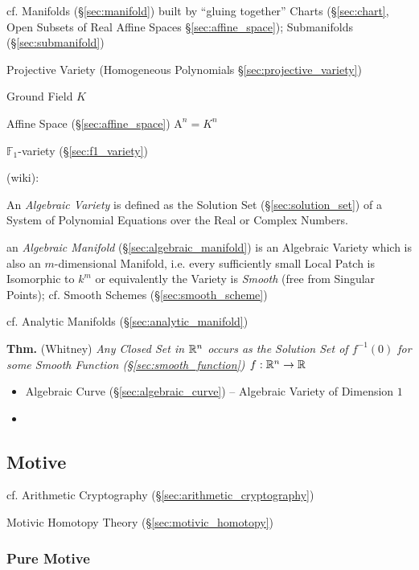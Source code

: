cf. Manifolds (\S\ref{sec:manifold}) built by ``gluing together'' Charts
(\S\ref{sec:chart}, Open Subsets of Real Affine Spaces
\S\ref{sec:affine_space}); Submanifolds (\S\ref{sec:submanifold})

\fist Projective Variety (Homogeneous Polynomials
\S\ref{sec:projective_variety})

Ground Field $K$

Affine Space (\S\ref{sec:affine_space}) $\mathrm{A}^n = K^n$

\fist $\mathbb{F}_1$-variety (\S\ref{sec:f1_variety})


(wiki):

An \emph{Algebraic Variety} is defined as the Solution Set
(\S\ref{sec:solution_set}) of a System of Polynomial Equations over the Real or
Complex Numbers.

\fist an \emph{Algebraic Manifold} (\S\ref{sec:algebraic_manifold}) is an
Algebraic Variety which is also an $m$-dimensional Manifold, i.e. every
sufficiently small Local Patch is Isomorphic to $k^m$ or equivalently the
Variety is \emph{Smooth} (free from Singular Points); cf. Smooth Schemes
(\S\ref{sec:smooth_scheme})

cf. Analytic Manifolds (\S\ref{sec:analytic_manifold})

\textbf{Thm.} (Whitney) \emph{Any Closed Set in $\mathbb{R}^n$ occurs as the
  Solution Set of $f^{-1}(0)$ for some Smooth Function
  (\S\ref{sec:smooth_function}) $f : \mathbb{R}^n \rightarrow \mathbb{R}$}

\begin{itemize}
  \item Algebraic Curve (\S\ref{sec:algebraic_curve}) -- Algebraic Variety of
    Dimension $1$
  \item
\end{itemize}



\subsection{Motive}\label{sec:motive}

cf. Arithmetic Cryptography (\S\ref{sec:arithmetic_cryptography})

Motivic Homotopy Theory (\S\ref{sec:motivic_homotopy})



\subsubsection{Pure Motive}\label{sec:pure_motive}


